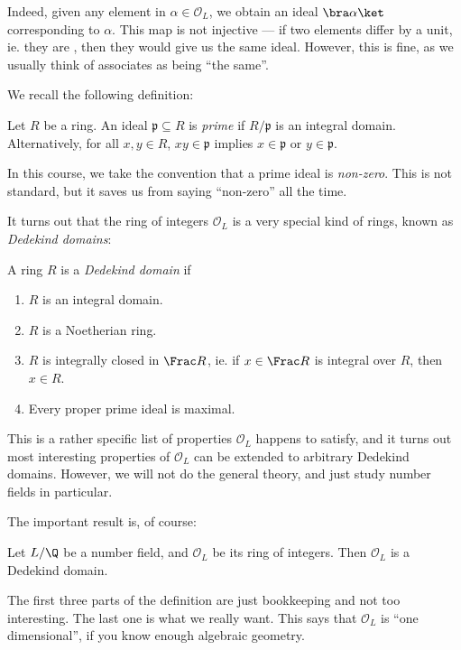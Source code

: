 \documentclass[a4paper]{article}
\begin{document}
Indeed, given any element in $\alpha \in \mathcal{O}_L$, we obtain an ideal $\bra \alpha \ket$ corresponding to $\alpha$. This map is not injective --- if two elements differ by a unit, ie. they are , then they would give us the same ideal. However, this is fine, as we usually think of associates as being ``the same''.

We recall the following definition:
\begin{defi}
  Let $R$ be a ring. An ideal $\mathfrak{p} \subseteq R$ is \emph{prime} if $R/\mathfrak{p}$ is an integral domain. Alternatively, for all $x, y \in R$, $xy \in \mathfrak{p}$ implies $x \in \mathfrak{p}$ or $y \in \mathfrak{p}$.

  In this course, we take the convention that a prime ideal is \emph{non-zero}. This is not standard, but it saves us from saying ``non-zero'' all the time.
\end{defi}

It turns out that the ring of integers $\mathcal{O}_L$ is a very special kind of rings, known as \emph{Dedekind domains}:
\begin{defi}
  A ring $R$ is a \emph{Dedekind domain} if
  \begin{enumerate}
    \item $R$ is an integral domain.
    \item $R$ is a Noetherian ring.
    \item $R$ is integrally closed in $\Frac R$, ie. if $x \in \Frac R$ is integral over $R$, then $x \in R$.
    \item Every proper prime ideal is maximal.
  \end{enumerate}
\end{defi}
This is a rather specific list of properties $\mathcal{O}_L$ happens to satisfy, and it turns out most interesting properties of $\mathcal{O}_L$ can be extended to arbitrary Dedekind domains. However, we will not do the general theory, and just study number fields in particular.

The important result is, of course:
\begin{prop}
  Let $L / \Q$ be a number field, and $\mathcal{O}_L$ be its ring of integers. Then $\mathcal{O}_L$ is a Dedekind domain.
\end{prop}
The first three parts of the definition are just bookkeeping and not too interesting. The last one is what we really want. This says that $\mathcal{O}_L$ is ``one dimensional'', if you know enough algebraic geometry.
\end{document}
